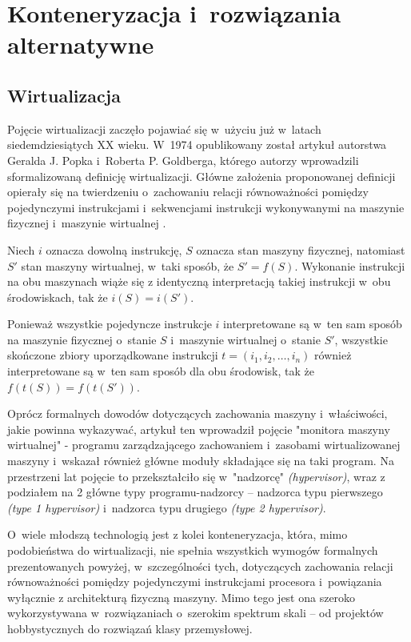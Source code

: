 
\section{Konteneryzacja i~rozwiązania alternatywne}
\subsection{Wirtualizacja}
Pojęcie wirtualizacji zaczęło pojawiać się w~użyciu już w~latach siedemdziesiątych XX wieku. W~1974 opublikowany został artykuł autorstwa Geralda J. Popka i~Roberta P. Goldberga, którego autorzy wprowadzili sformalizowaną definicję wirtualizacji. Główne założenia proponowanej definicji opierały się na twierdzeniu o~zachowaniu relacji równoważności pomiędzy pojedynczymi instrukcjami i~sekwencjami instrukcji wykonywanymi na maszynie fizycznej i~maszynie wirtualnej \cite{virtualization}.

\begin{lemat}
	Niech $i$ oznacza dowolną instrukcję, $S$ oznacza stan maszyny fizycznej, natomiast $S'$ stan maszyny wirtualnej, w~taki sposób, że $S' = f(S)$. Wykonanie instrukcji na obu maszynach wiąże się z identyczną interpretacją takiej instrukcji w~obu środowiskach, tak że $i(S) = i(S')$.
\end{lemat}

\begin{lemat}
	Ponieważ wszystkie pojedyncze instrukcje $i$ interpretowane są w~ten sam sposób na maszynie fizycznej o~stanie $S$ i~maszynie wirtualnej o~stanie $S'$, wszystkie skończone zbiory uporządkowane instrukcji $t = (i_1, i_2, \ldots, i_n)$ również interpretowane są w~ten sam sposób dla obu środowisk, tak że $f(t(S)) = f(t(S'))$.
\end{lemat}

\noindent Oprócz formalnych dowodów dotyczących zachowania maszyny i~właściwości, jakie powinna wykazywać, artykuł ten wprowadził pojęcie "monitora maszyny wirtualnej" - programu zarządzającego zachowaniem i~zasobami wirtualizowanej maszyny i~wskazał również główne moduły składające się na taki program. Na przestrzeni lat pojęcie to przekształciło się w~"nadzorcę" \textit{(hypervisor)}, wraz z podziałem na 2 główne typy programu-nadzorcy -- nadzorca typu pierwszego \textit{(type 1 hypervisor)} i~nadzorca typu drugiego \textit{(type 2 hypervisor)}.

\noindent O~wiele młodszą technologią jest z kolei konteneryzacja, która, mimo podobieństwa do wirtualizacji, nie spełnia wszystkich wymogów formalnych prezentowanych powyżej, w~szczególności tych, dotyczących zachowania relacji równoważności pomiędzy pojedynczymi instrukcjami procesora i~powiązania wyłącznie z architekturą fizyczną maszyny. Mimo tego jest ona szeroko wykorzystywana w~rozwiązaniach o~szerokim spektrum skali -- od projektów hobbystycznych do rozwiązań klasy przemysłowej.

